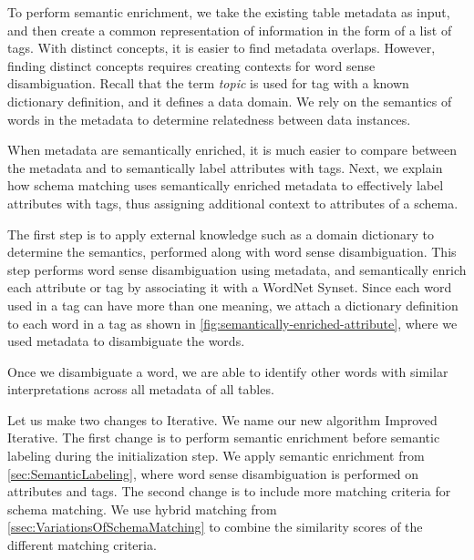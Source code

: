 To perform semantic enrichment, we take the existing table metadata as input, and then create a common representation of information in the form of a list of tags.
With distinct concepts, it is easier to find metadata overlaps.
However, finding distinct concepts requires creating contexts for word sense disambiguation.
Recall that the term \textit{topic} is used for tag with a known dictionary definition, and it defines a data domain.
We rely on the semantics of words in the metadata to determine relatedness between data instances.

When metadata are semantically enriched, it is much easier to compare between the metadata and to semantically label attributes with tags. Next, we explain how schema matching uses semantically enriched metadata to effectively label attributes with tags, thus assigning additional context to attributes of a schema.



The first step is to apply external knowledge such as a domain dictionary to determine the semantics, performed along with word sense disambiguation.
This step performs word sense disambiguation using metadata, and semantically enrich each attribute or tag by associating it with a WordNet Synset.
Since each word used in a tag can have more than one meaning, we attach a dictionary definition to each word in a tag as shown in \autoref{fig:semantically-enriched-attribute}, where we used metadata to disambiguate the words.

Once we disambiguate a word, we are able to identify other words with similar interpretations across all metadata of all tables.

Let us make two changes to Iterative. We name our new algorithm Improved Iterative. The first change is to perform semantic enrichment before semantic labeling during the initialization step. We apply semantic enrichment from \autoref{sec:SemanticLabeling}, where word sense disambiguation is performed on attributes and tags. The second change is to include more matching criteria for schema matching. We use hybrid matching from \autoref{ssec:VariationsOfSchemaMatching} to combine the similarity scores of the different matching criteria.

